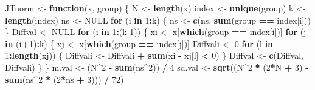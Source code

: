 \documentclass[
]{book}
\newenvironment{Shaded}{\begin{snugshade}}{\end{snugshade}}
\newcommand{\ConstantTok}[1]{\textcolor[rgb]{0.56,0.35,0.01}{#1}}
\newcommand{\ControlFlowTok}[1]{\textcolor[rgb]{0.13,0.29,0.53}{\textbf{#1}}}
\newcommand{\DecValTok}[1]{\textcolor[rgb]{0.00,0.00,0.81}{#1}}
\newcommand{\FunctionTok}[1]{\textcolor[rgb]{0.13,0.29,0.53}{\textbf{#1}}}
\newcommand{\NormalTok}[1]{#1}
\newcommand{\OtherTok}[1]{\textcolor[rgb]{0.56,0.35,0.01}{#1}}
\newcommand{\SpecialCharTok}[1]{\textcolor[rgb]{0.81,0.36,0.00}{\textbf{#1}}}
\begin{document}
\begin{Shaded}
\begin{Highlighting}[]
\NormalTok{JTnorm }\OtherTok{\textless{}{-}} \ControlFlowTok{function}\NormalTok{(x, group) \{}
\NormalTok{  N }\OtherTok{\textless{}{-}} \FunctionTok{length}\NormalTok{(x)}
\NormalTok{  index }\OtherTok{\textless{}{-}} \FunctionTok{unique}\NormalTok{(group)}
\NormalTok{  k }\OtherTok{\textless{}{-}} \FunctionTok{length}\NormalTok{(index)}
\NormalTok{  ns }\OtherTok{\textless{}{-}} \ConstantTok{NULL}
  \ControlFlowTok{for}\NormalTok{ (i }\ControlFlowTok{in} \DecValTok{1}\SpecialCharTok{:}\NormalTok{k) \{}
\NormalTok{    ns }\OtherTok{\textless{}{-}} \FunctionTok{c}\NormalTok{(ns, }\FunctionTok{sum}\NormalTok{(group }\SpecialCharTok{==}\NormalTok{ index[i]))}
\NormalTok{  \}}
\NormalTok{  Diffval }\OtherTok{\textless{}{-}} \ConstantTok{NULL}
  \ControlFlowTok{for}\NormalTok{ (i }\ControlFlowTok{in} \DecValTok{1}\SpecialCharTok{:}\NormalTok{(k}\DecValTok{{-}1}\NormalTok{)) \{}
\NormalTok{    xi }\OtherTok{\textless{}{-}}\NormalTok{ x[}\FunctionTok{which}\NormalTok{(group }\SpecialCharTok{==}\NormalTok{ index[i])]}
    \ControlFlowTok{for}\NormalTok{ (j }\ControlFlowTok{in}\NormalTok{ (i}\SpecialCharTok{+}\DecValTok{1}\NormalTok{)}\SpecialCharTok{:}\NormalTok{k) \{}
\NormalTok{      xj }\OtherTok{\textless{}{-}}\NormalTok{ x[}\FunctionTok{which}\NormalTok{(group }\SpecialCharTok{==}\NormalTok{ index[j])]}
\NormalTok{      Diffvali }\OtherTok{\textless{}{-}} \DecValTok{0}
      \ControlFlowTok{for}\NormalTok{ (l }\ControlFlowTok{in} \DecValTok{1}\SpecialCharTok{:}\FunctionTok{length}\NormalTok{(xj)) \{}
\NormalTok{        Diffvali }\OtherTok{\textless{}{-}}\NormalTok{ Diffvali }\SpecialCharTok{+} \FunctionTok{sum}\NormalTok{(xi }\SpecialCharTok{{-}}\NormalTok{ xj[l] }\SpecialCharTok{\textless{}} \DecValTok{0}\NormalTok{)}
\NormalTok{      \}}
\NormalTok{      Diffval }\OtherTok{\textless{}{-}} \FunctionTok{c}\NormalTok{(Diffval, Diffvali)}
\NormalTok{    \}}
\NormalTok{  \}}
\NormalTok{  m.val }\OtherTok{\textless{}{-}}\NormalTok{ (N}\SpecialCharTok{\^{}}\DecValTok{2} \SpecialCharTok{{-}} \FunctionTok{sum}\NormalTok{(ns}\SpecialCharTok{\^{}}\DecValTok{2}\NormalTok{)) }\SpecialCharTok{/} \DecValTok{4}
\NormalTok{  sd.val }\OtherTok{\textless{}{-}} \FunctionTok{sqrt}\NormalTok{((N}\SpecialCharTok{\^{}}\DecValTok{2} \SpecialCharTok{*}\NormalTok{ (}\DecValTok{2}\SpecialCharTok{*}\NormalTok{N }\SpecialCharTok{+} \DecValTok{3}\NormalTok{) }\SpecialCharTok{{-}} \FunctionTok{sum}\NormalTok{(ns}\SpecialCharTok{\^{}}\DecValTok{2} \SpecialCharTok{*}\NormalTok{ (}\DecValTok{2}\SpecialCharTok{*}\NormalTok{ns }\SpecialCharTok{+} \DecValTok{3}\NormalTok{))) }\SpecialCharTok{/} \DecValTok{72}\NormalTok{)}

\end{Highlighting}
\end{Shaded}
\end{document}
